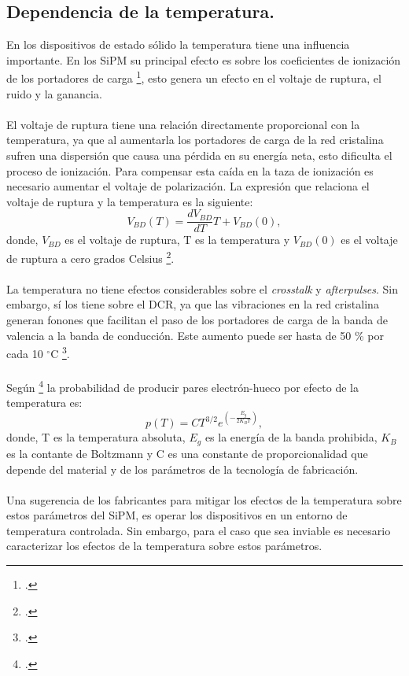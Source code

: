 \subsection{Dependencia de la temperatura.}
En los dispositivos de estado sólido la temperatura tiene una influencia importante. En los SiPM su principal efecto es sobre los coeficientes de ionización de los portadores de carga \footcite{Temp_dependencia_APD}, esto genera un efecto en el voltaje de ruptura, el ruido y la ganancia.\\ \\
El voltaje de ruptura tiene una relación directamente proporcional con la temperatura, ya que al aumentarla los portadores de carga de la red cristalina sufren una dispersión  que causa una pérdida en su energía neta, esto dificulta el proceso de ionización. Para compensar esta caída en la taza de ionización es necesario aumentar el voltaje de polarización. La expresión que relaciona el voltaje de ruptura y la temperatura es la siguiente: 
\begin{equation}
    V_{BD}(T) = \frac{dV_{BD}}{dT}T+V_{BD}(0),
    \label{ruptura_eq}
\end{equation}
donde, $V_{BD}$ es el voltaje de ruptura, T es la temperatura y $V_{BD}(0)$ es el voltaje de ruptura a cero grados Celsius \footcite{Charct_dep_temp}.  
\\ \\
La temperatura no tiene efectos considerables sobre el \textit{crosstalk} y \textit{afterpulses}. Sin embargo, sí los tiene sobre el DCR, ya que las vibraciones en la red cristalina generan fonones que facilitan el paso de los portadores de carga de la banda de valencia a la banda de conducción. Este aumento puede ser hasta de 50 \% por cada 10 $^\circ$C \footcite{MPPC_note}.\\ \\
Según \footcite{Charct_dep_temp} la probabilidad de producir pares electrón-hueco por efecto de la temperatura es:
\begin{equation}
    p(T) = CT^{3/2}e^{\left( -\frac{E_g}{2K_BT} \right)},
\end{equation}
donde, T es la temperatura absoluta, $E_g$ es la energía de la banda prohibida, $K_B$ es la contante de Boltzmann y C es una constante de proporcionalidad que depende del material y de los parámetros de la tecnología de fabricación.\\ \\
Una sugerencia de los fabricantes para mitigar los efectos de la temperatura sobre estos parámetros del SiPM, es operar los dispositivos en un entorno de temperatura controlada. Sin  embargo, para el caso  que sea inviable es necesario caracterizar los efectos de la temperatura sobre estos parámetros.      
